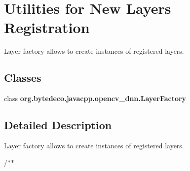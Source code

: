 \hypertarget{group__dnn_layer_factory}{}\section{Utilities for New Layers Registration}
\label{group__dnn_layer_factory}


Layer factory allows to create instances of registered layers.  


\subsection*{Classes}
\begin{DoxyCompactItemize}
\item 
class {\bfseries org.\+bytedeco.\+javacpp.\+opencv\+\_\+dnn.\+Layer\+Factory}
\end{DoxyCompactItemize}


\subsection{Detailed Description}
Layer factory allows to create instances of registered layers. 

/$\ast$$\ast$ 